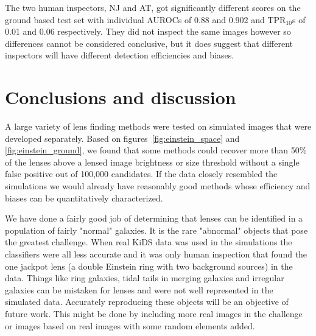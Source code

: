 \documentclass{aa}
\newcommand{\red}[1]{{\color{red} #1}}
\begin{document}
The two human inspectors, NJ and AT, got significantly different scores on the ground based test set with individual AUROCs of 0.88 and 0.902 and TPR$_{10}$s of 0.01 and 0.06 respectively.  They did not inspect the same images however so differences cannot be considered conclusive, but it does suggest that different inspectors will have different detection efficiencies and biases.


\section{Conclusions and discussion}
\label{sec:conclusion}

A large variety of lens finding methods were tested on simulated images that were developed separately.    Based on figures~\ref{fig:einstein_space} and \ref{fig:einstein_ground}, we found that some methods could recover more than 50\% of the lenses above a lensed image brightness or size threshold without a single false positive out of 100,000 candidates.  If the data closely resembled the simulations we would already have reasonably good methods whose efficiency and biases can be quantitatively characterized.

We have done a fairly good job of determining that lenses can be identified in a population of fairly "normal" galaxies.  It is the rare "abnormal" objects that pose the greatest challenge.  When real KiDS data was used in the simulations the classifiers were all less accurate and it was only human inspection that found the one jackpot lens (a double Einstein ring with two background sources) in the data.  Things like ring galaxies, tidal tails in merging galaxies and irregular galaxies can be mistaken for lenses and were not well represented in the simulated data.  Accurately reproducing these objects will be an objective of future work.  This might be done by including more real images in the challenge or images based on real images with some random elements added.
\end{document}
